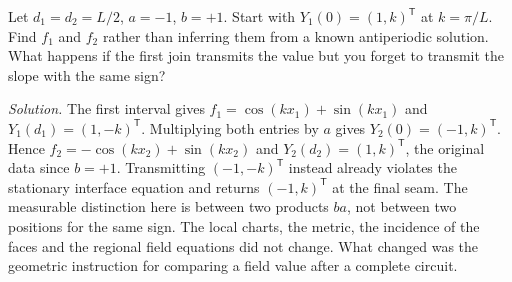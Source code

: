 \begin{exercise}
Let $d_1=d_2=L/2$, $a=-1$, $b=+1$. Start with $Y_1(0)=(1,k)^{\mathsf T}$ at $k=\pi/L$. Find $f_1$ and $f_2$ rather than inferring them from a known antiperiodic solution. What happens if the first join transmits the value but you forget to transmit the slope with the same sign?
\end{exercise}
\noindent\emph{Solution.} The first interval gives $f_1=\cos(kx_1)+\sin(kx_1)$ and $Y_1(d_1)=(1,-k)^{\mathsf T}$. Multiplying both entries by $a$ gives $Y_2(0)=(-1,k)^{\mathsf T}$. Hence $f_2=-\cos(kx_2)+\sin(kx_2)$ and $Y_2(d_2)=(1,k)^{\mathsf T}$, the original data since $b=+1$. Transmitting $(-1,-k)^{\mathsf T}$ instead already violates the stationary interface equation and returns $(-1,k)^{\mathsf T}$ at the final seam. The measurable distinction here is between two products $ba$, not between two positions for the same sign. The local charts, the metric, the incidence of the faces and the regional field equations did not change. What changed was the geometric instruction for comparing a field value after a complete circuit.

